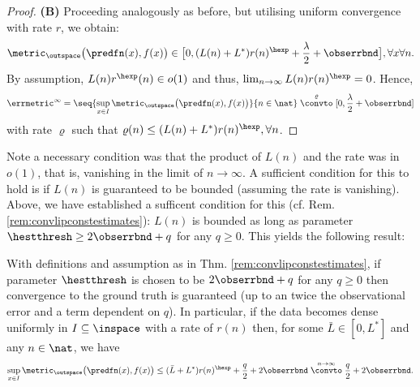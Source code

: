 \begin{thm}
\begin{proof}
\textbf{(B)} Proceeding analogously as before, but utilising uniform convergence with rate $r$, we obtain:  \begin{equation} 
\metric_\outspace\bigl(\predfn(x) , f(x)\bigr)  \in \bigl[0, (L(n)+ L^*) r(n)^\hexp +  \frac \lambda 2 +\obserrbnd \bigr], \forall x \forall n. \end{equation} 
By assumption,  $L(n) r^\hexp(n) \in o(1)$ and thus, $\lim_{n \to \infty} L(n) r(n)^\hexp = 0$. Hence,  $$\errmetric^\infty = \seq{\sup_{x \in I} \metric_\outspace\bigl(\predfn(x) , f(x)\bigr) }{n \in \nat} \stackrel{\varrho}{\convto} [0, \frac \lambda 2 +\obserrbnd] $$ with rate $\varrho $ such that $\varrho(n) \leq (L(n)+ L^*) r(n)^\hexp, \forall n$.

\end{proof}
\end{thm}

Note a necessary condition was that the product of $L(n)$ and the rate was in $o(1)$, that is, vanishing in the limit of $n \to \infty$. A sufficient condition for this to hold is if $L(n)$ is guaranteed to be bounded (assuming the rate is vanishing). Above, we have established a sufficent condition for this (cf. Rem. \ref{rem:convlipconstestimates}): $L(n)$ is bounded as long as parameter $\hestthresh \geq 2 \obserrbnd + q$ for any $q \geq 0$. This yields the following result:

\begin{cor}
With definitions and assumption as in Thm. \ref{rem:convlipconstestimates}, if parameter $\hestthresh $ is chosen to be $2 \obserrbnd + q $ for any $q \geq 0$ then convergence to the ground truth is guaranteed (up to an twice the observational error and a term dependent on $q$). In particular, if the data becomes dense uniformly in $I \subseteq \inspace$ with a rate of $r(n)$  then, for some $\bar L \in [0,L^*]$ and any $n \in \nat$, we have 
\begin{equation}
\sup_{x \in I} \metric_\outspace\bigl(\predfn(x) , f(x)\bigr) \leq (\bar L+ L^*) r(n)^\hexp +  \frac { q} 2 +2 \obserrbnd  \stackrel{n \to \infty}{\convto}  \frac q 2 + 2  \obserrbnd . \end{equation} 
\label{cor:worstcaseconvhoeldertarget}
\end{cor}

